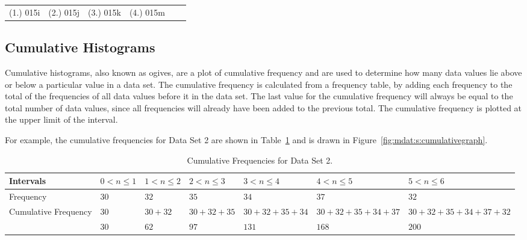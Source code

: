{%
\par \practiceinfo
\par \begin{tabular}[h]{cccccc}
(1.)	015i	&
(2.)	015j	&
(3.)	015k	&
(4.)	015m	&
\end{tabular}}

\subsection{Cumulative Histograms}
Cumulative histograms, also known as ogives, are a plot of cumulative frequency and are used to determine how many data values lie above or below a particular value in a data set. The cumulative frequency is calculated from a frequency table, by adding each frequency to the total of the frequencies of all data values before it in the data set. The last value for the cumulative frequency will always be equal to the total number of data values, since all frequencies will already have been added to the previous total. The cumulative frequency is plotted at the upper limit of the interval.

For example, the cumulative frequencies for Data Set 2 are shown in Table~\ref{tab:mdat:s:cumulativeds2} and is drawn in Figure~\ref{fig:mdat:s:cumulativegraph}.

\begin{table}[htb]
\begin{center}
\begin{tabular}{|p{1.5cm}||p{1.5cm}|p{1.5cm}|p{1.5cm}|p{1.5cm}|p{1.5cm}|p{1.5cm}|}\hline
Intervals & $0<n\leq 1 $ & $1<n\leq 2 $ & $2<n\leq 3 $ & $3<n\leq 4 $ & $4<n\leq 5$ & $5<n\leq 6 $ \\ 
\hline
Frequency & $30$ &$32$ &$35$ &$34$ &$37$ &$32$\\
\hline
Cumulative Frequency & $30$ &$30 + 32$ &$30 + 32 + 35$ &$30 + 32 + 35 + 34$ &$30 + 32 + 35 + 34 + 37 $&$30 + 32 + 35 + 34 + 37 + 32$\\
\hline
& $30$ &$ 62$ & $97$ & $131$ & $168$ & $200$\\
\hline
\end{tabular}
\caption{Cumulative Frequencies for Data Set 2. \label{tab:mdat:s:cumulativeds2}}
\end{center}
\end{table}

